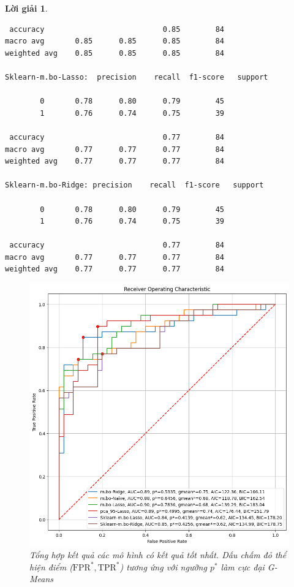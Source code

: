 \documentclass[14pt, a4paper]{article}
\theoremstyle{sltheorem}
\theoremstyle{soltheorem}
\newtheorem*{loigiai}{Lời giải}
\begin{document}
\begin{loigiai}
\begin{verbatim}
 accuracy                           0.85        84
macro avg       0.85      0.85      0.85        84
weighted avg    0.85      0.85      0.85        84

Sklearn-m.bo-Lasso:  precision    recall  f1-score   support

        0       0.78      0.80      0.79        45
        1       0.76      0.74      0.75        39

 accuracy                           0.77        84
macro avg       0.77      0.77      0.77        84
weighted avg    0.77      0.77      0.77        84

Sklearn-m.bo-Ridge: precision    recall  f1-score   support

        0       0.78      0.80      0.79        45
        1       0.76      0.74      0.75        39

 accuracy                           0.77        84
macro avg       0.77      0.77      0.77        84
weighted avg    0.77      0.77      0.77        84

    \end{verbatim}

    \begin{figure}[h!]
        \centering
        \includegraphics[width=1.0\textwidth]{figures/little_roc_curve_summary.png}
        \caption{Tổng hợp kết quả các mô hình có kết quả tốt nhất. Dấu chấm đỏ thể hiện điểm ($\mathrm{FPR}^*, \mathrm{TPR}^*$) tương ứng với ngưỡng $p^*$ làm cực đại G-Means}
        \label{fig:little-roc-curve-summary}
    \end{figure}


\end{loigiai}
\end{document}
